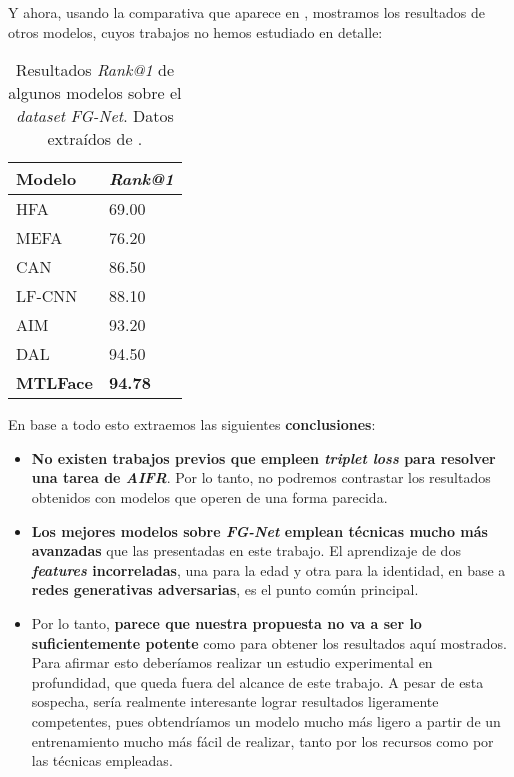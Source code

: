 Y ahora, usando la comparativa que aparece en \cite{informatica:best_fgnet_model}, mostramos los resultados de otros modelos, cuyos trabajos no hemos estudiado en detalle:

\begin{table}[H]
	\centering
	\begin{tabular}{|l|l|}
		\hline
		Modelo           & \textit{Rank@1} \\
		\hline
		HFA              & 69.00           \\
		MEFA             & 76.20           \\
		CAN              & 86.50           \\
		LF-CNN           & 88.10           \\
		AIM              & 93.20           \\
		DAL              & 94.50           \\
		\textbf{MTLFace} & \textbf{94.78}  \\
		\hline
	\end{tabular}
	\caption{Resultados \textit{Rank@1} de algunos modelos sobre el \textit{dataset} \textit{FG-Net}. Datos extraídos de \cite{informatica:best_fgnet_model}.}
\end{table}

En base a todo esto extraemos las siguientes \textbf{conclusiones}:

\begin{itemize}
	\item \textbf{No existen trabajos previos que empleen \textit{triplet loss} para resolver una tarea de \textit{AIFR}}. Por lo tanto, no podremos contrastar los resultados obtenidos con modelos que operen de una forma parecida.
	\item \textbf{Los mejores modelos sobre \textit{FG-Net} emplean técnicas mucho más avanzadas} que las presentadas en este trabajo. El aprendizaje de dos \textbf{\textit{features} incorreladas}, una para la edad y otra para la identidad, en base a \textbf{redes generativas adversarias}, es el punto común principal.
	\item Por lo tanto, \textbf{parece que nuestra propuesta no va a ser lo suficientemente potente} como para obtener los resultados aquí mostrados. Para afirmar esto deberíamos realizar un estudio experimental en profundidad, que queda fuera del alcance de este trabajo. A pesar de esta sospecha, sería realmente interesante lograr resultados ligeramente competentes, pues obtendríamos un modelo mucho más ligero a partir de un entrenamiento mucho más fácil de realizar, tanto por los recursos como por las técnicas empleadas.
\end{itemize}
